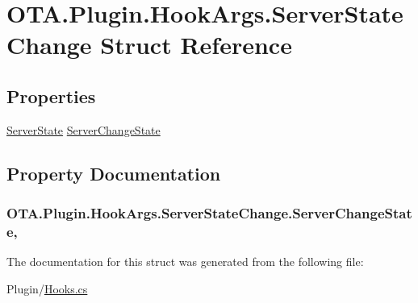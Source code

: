\hypertarget{struct_o_t_a_1_1_plugin_1_1_hook_args_1_1_server_state_change}{}\section{O\+T\+A.\+Plugin.\+Hook\+Args.\+Server\+State\+Change Struct Reference}
\label{struct_o_t_a_1_1_plugin_1_1_hook_args_1_1_server_state_change}
\subsection*{Properties}
\begin{DoxyCompactItemize}
\item 
\hyperlink{namespace_o_t_a_ab97ab16dfa3c2e92e2f3b2342ea84bd0}{Server\+State} \hyperlink{struct_o_t_a_1_1_plugin_1_1_hook_args_1_1_server_state_change_ab28546713f21e767d02062305fc27223}{Server\+Change\+State}
\end{DoxyCompactItemize}


\subsection{Property Documentation}
\hypertarget{struct_o_t_a_1_1_plugin_1_1_hook_args_1_1_server_state_change_ab28546713f21e767d02062305fc27223}{}
\subsubsection[{Server\+Change\+State}]{ O\+T\+A.\+Plugin.\+Hook\+Args.\+Server\+State\+Change.\+Server\+Change\+State\hspace{0.3cm}{\ttfamily [get]}, {\ttfamily [set]}}\label{struct_o_t_a_1_1_plugin_1_1_hook_args_1_1_server_state_change_ab28546713f21e767d02062305fc27223}


The documentation for this struct was generated from the following file\+:\begin{DoxyCompactItemize}
\item 
Plugin/\hyperlink{_hooks_8cs}{Hooks.\+cs}\end{DoxyCompactItemize}
